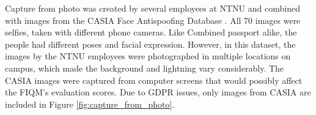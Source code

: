 %
Capture from photo was created by several employees at NTNU and combined with images from the CASIA Face Antispoofing Database \cite{CASIA-FAD}. All 70 images were selfies, taken with different phone cameras. Like Combined passport alike, the people had different poses and facial expression. However, in this dataset, the images by the NTNU employees were photographed in multiple locations on campus, which made the background and lightning vary considerably. The CASIA images were captured from computer screens that would possibly affect the FIQM's evaluation scores. Due to GDPR issues, only images from CASIA are included in Figure \ref{fig:capture_from_photo}.
%

